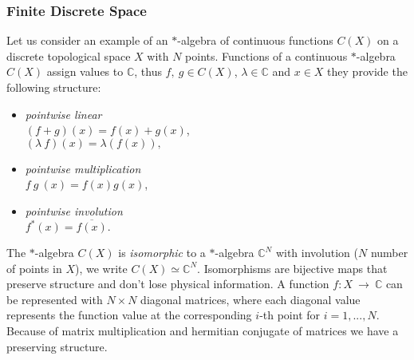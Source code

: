\subsubsection{Finite Discrete Space}
Let us consider an example of an $*$-algebra of continuous functions $C(X)$
on a discrete topological space $X$ with $N$ points. Functions of a
continuous $*$-algebra $C(X)$ assign values to $\mathbb{C}$, thus $f,\ g \in
C(X)$, $\lambda \in \mathbb{C}$ and $x \in X$ they provide the following structure:
\begin{itemize}
    \item \textit{pointwise linear} \\
      $(f + g)(x) = f(x) + g(x)$,\\
      $(\lambda\ f)(x) = \lambda (f(x)),$
    \item \textit{pointwise multiplication} \\
        $f\ g\ (x) = f(x)g(x)$,
    \item \textit{pointwise involution} \\
        $f^*(x) = \overline{f(x)}.$
\end{itemize}
The $*$-algebra $C(X)$ is \textit{isomorphic} to a $*$-algebra $\mathbb{C}^N$
with involution ($N$ number of points in $X$), we write $C(X) \simeq
\mathbb{C}^N$.  Isomorphisms are bijective maps that preserve structure and
don't lose physical information.  A function $f:X\ \rightarrow\ \mathbb{C}$
can be represented with $N \times N$ diagonal matrices, where each diagonal
value represents the function value at the corresponding $i$-th point for $i
= 1,...,N$. Because of matrix multiplication and hermitian conjugate of
matrices we have a preserving structure.

